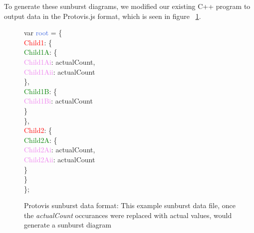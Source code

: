 To generate these sunburst diagrams, we modified our existing C++ program to output data in the Protovis.js format, which is seen in figure ~\ref{fig:oronymsunburst:exampleSunburstJS}. 

\begin{figure}
\begin{tabbing}
var \textcolor{RoyalBlue}{root} = \{\= \\
\>  \textcolor{Red}{Child1}: \{\= \\
\>\>    \textcolor{Green}{Child1A}: \{\= \\
\>\>\>      \textcolor{Violet}{Child1Ai}: \textcolor{VioletRed}{actualCount}, \\
\>\>\>      \textcolor{Violet}{Child1Aii}: \textcolor{VioletRed}{actualCount} \\
\>\>    \}, \\
\>\>    \textcolor{Green}{Child1B}: \{ \\
\>\>\>      \textcolor{Violet}{Child1Bi}: \textcolor{VioletRed}{actualCount} \\
\>\>    \} \\
\>  \},  \\
\>  \textcolor{Red}{Child2}: \{ \\
\>\>    \textcolor{Green}{Child2A}: \{ \\
\>\>\>      \textcolor{Violet}{Child2Ai}: \textcolor{VioletRed}{actualCount}, \\
\>\>\>      \textcolor{Violet}{Child2Aii}: \textcolor{VioletRed}{actualCount} \\
\>\>    \} \\
\>  \} \\
\};
\end{tabbing}
\captionfonts
\caption[Example Sunburst Diagram]{ Protovis sunburst data format: This example sunburst data file, once the \emph{actualCount} occurances were replaced with actual values, would generate a sunburst diagram}
\label{fig:oronymsunburst:exampleSunburstJS}
\end{figure}


